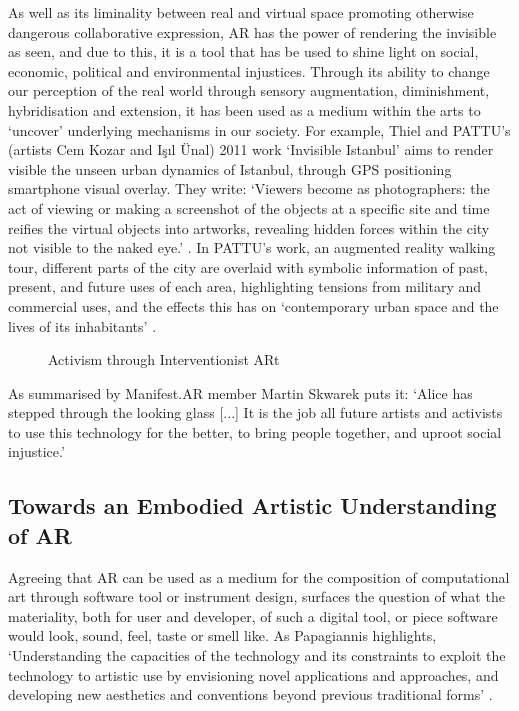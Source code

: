 As well as its liminality between real and virtual space promoting otherwise dangerous collaborative expression, AR has the power of rendering the invisible as seen, and due to this, it is a tool that has be used to shine light on social, economic, political and environmental injustices. Through its ability to change our perception of the real world through sensory augmentation, diminishment, hybridisation and extension, it has been used as a medium within the arts to `uncover' underlying mechanisms in our society. For example, Thiel and PATTU's (artists Cem Kozar and Işıl Ünal) 2011 work `Invisible Istanbul' aims to render visible the unseen urban dynamics of Istanbul, through GPS positioning smartphone visual overlay. They write: `Viewers become as photographers: the act of viewing or making a screenshot of the objects at a specific site and time reifies the virtual objects into artworks, revealing hidden forces within the city not visible to the naked eye.' \citeyearpar{thiel2011}. In PATTU's work, an augmented reality walking tour, different parts of the city are overlaid with symbolic information of past, present, and future uses of each area, highlighting tensions from military and commercial uses, and the effects this has on `contemporary urban space and the lives of its inhabitants' \citeyearpar{thiel2018}.

\begin{figure}
    \centering
    \caption{Activism through Interventionist ARt}
    \label{fig: activismARt}
\end{figure}

As summarised by Manifest.AR member Martin Skwarek puts it: `Alice has stepped through the looking glass [...] It is the job all future artists and activists to use this technology for the better, to bring people together, and uproot social injustice.' \citeyearpar{skwarek2018}



\subsection{Towards an Embodied Artistic Understanding of AR}\label{sec: literature-arts-designingart}
Agreeing that AR can be used as a medium for the composition of computational art through software tool or instrument design, surfaces the question of what the materiality, both for user and developer, of such a digital tool, or piece software would look, sound, feel, taste or smell like. As Papagiannis highlights, `Understanding the capacities of the technology and its constraints to exploit the technology to artistic use by envisioning novel applications and approaches, and developing new aesthetics and conventions beyond previous traditional forms' \citeyearpar{papagiannis2017}.

